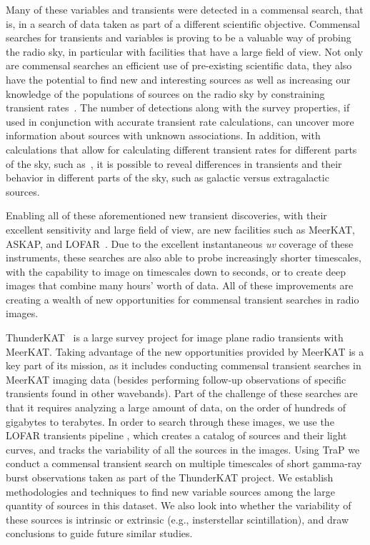 \documentclass[12pt]{article}
\begin{document}
Many of these variables and transients were detected in a commensal search, that is, in a search of data taken as part of a different scientific objective. Commensal searches for transients and variables is proving to be a valuable way of probing the radio sky, in particular with facilities that have a large field of view. Not only are commensal searches an efficient use of pre-existing scientific data, they also have the potential to find new and interesting sources as well as increasing our knowledge of the populations of sources on the radio sky by constraining transient rates~\citep[e.g.,][]{2011ApJ...728L..14B,2016MNRAS.459.3161C}. The number of detections along with the survey properties, if used in conjunction with accurate transient rate calculations, can uncover more information about sources with unknown associations. In addition, with calculations that allow for calculating different transient rates for different parts of the sky, such as~\citep{2022ascl.soft04007C}, it is possible to reveal differences in transients and their behavior in different parts of the sky, such as galactic versus extragalactic sources. 

Enabling all of these aforementioned new transient discoveries, with their excellent sensitivity and large field of view, are new facilities such as MeerKAT, ASKAP, and LOFAR~\citep{2009IEEEP..97.1522J,2008ExA....22..151J,2013A&A...556A...2V}. Due to the excellent instantaneous {\it uv} coverage of these instruments, these searches are also able to probe increasingly shorter timescales, with the capability to image on timescales down to seconds, or to create deep images that combine many hours' worth of data. All of these improvements are creating a wealth of new opportunities for commensal transient searches in radio images. 

ThunderKAT~\citep{2016mks..confE..13F} is a large survey project for image plane radio transients with MeerKAT. Taking advantage of the new opportunities provided by MeerKAT is a key part of its mission, as it includes conducting commensal transient searches in MeerKAT imaging data (besides performing follow-up observations of specific transients found in other wavebands). Part of the challenge of these searches are that it requires analyzing a large amount of data, on the order of hundreds of gigabytes to terabytes. In order to search through these images, we use the LOFAR transients pipeline \citep[{\sc TraP};][]{2015A&C....11...25S}, which creates a catalog of sources and their light curves, and tracks the variability of all the sources in the images. Using TraP we conduct a commensal transient search on multiple timescales of short gamma-ray burst observations taken as part of the ThunderKAT project. We establish methodologies and techniques to find new variable sources among the large quantity of sources in this dataset. We also look into whether the variability of these sources is intrinsic or extrinsic (e.g., insterstellar scintillation), and draw conclusions to guide future similar studies. 
\end{document}

